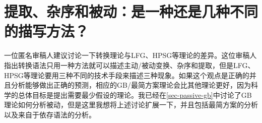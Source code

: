 \chapter{提取、杂序和被动：是一种还是几种不同的描写方法？}
\label{chap-scrambling-extraction-passive}

一位匿名审稿人建议讨论一下转换理论与LFG、HPSG等理论的差异。这位审稿人指出转换语法只用一种方法就可以描述主动/被动变换、杂序和提取，但是LFG、HPSG等理论要用三种不同的技术手段来描述三种现象。如果这个观点是正确的并且分析能够做出正确的预测，相应的GB/最简方案理论会比其他理论更好，因为科学的总体目标是提出需要最少假设的理论。我已经在\ref{sec-passive-gb}中讨论了GB理论如何分析被动，但是这里我想将上述讨论扩展一下，并且包括最简方案的分析以及来自于依存语法的分析。

